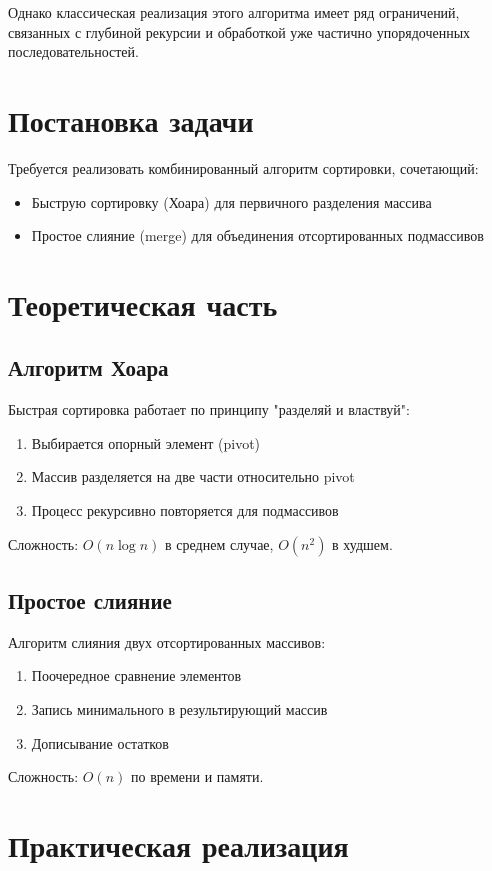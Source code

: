 \documentclass[a4paper,12pt]{article}
\begin{document}
Однако классическая реализация этого алгоритма имеет ряд ограничений, связанных с глубиной рекурсии и обработкой уже частично упорядоченных последовательностей.
\newpage

\section{Постановка задачи}
Требуется реализовать комбинированный алгоритм сортировки, сочетающий:
\begin{itemize}
    \item Быструю сортировку (Хоара) для первичного разделения массива
    \item Простое слияние (merge) для объединения отсортированных подмассивов
\end{itemize}

\section{Теоретическая часть}
\subsection{Алгоритм Хоара}
Быстрая сортировка работает по принципу "разделяй и властвуй":
\begin{enumerate}
    \item Выбирается опорный элемент (pivot)
    \item Массив разделяется на две части относительно pivot
    \item Процесс рекурсивно повторяется для подмассивов
\end{enumerate}

Сложность: $O(n \log n)$ в среднем случае, $O(n^2)$ в худшем.

\subsection{Простое слияние}
Алгоритм слияния двух отсортированных массивов:
\begin{enumerate}
    \item Поочередное сравнение элементов
    \item Запись минимального в результирующий массив
    \item Дописывание остатков
\end{enumerate}

Сложность: $O(n)$ по времени и памяти.

\section{Практическая реализация}
\end{document}
